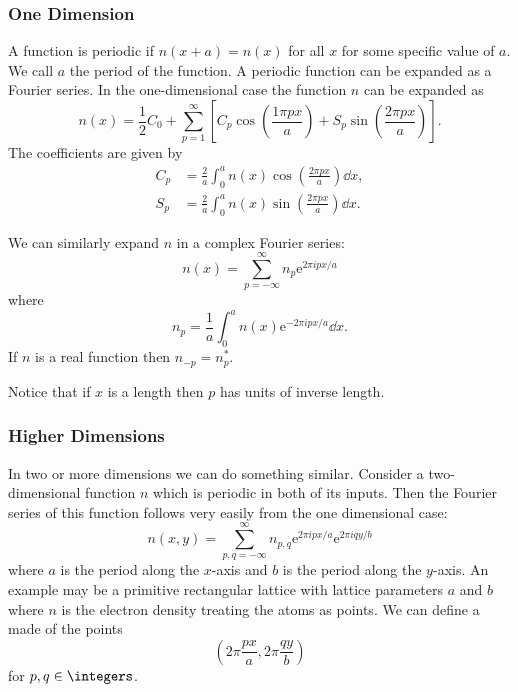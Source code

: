 \documentclass[fleqn]{NotesClass}
\newcommand*{\e}{\mathrm{e}}
\begin{document}
    \subsubsection{One Dimension}
    A function is periodic if \(n(x + a) = n(x)\) for all \(x\) for some specific value of \(a\).
    We call \(a\) the period of the function.
    A periodic function can be expanded as a Fourier series.
    In the one-dimensional case the function \(n\) can be expanded as
    \begin{equation}
        n(x) = \frac{1}{2} C_0 + \sum_{p=1}^{\infty} \left[ C_p \cos\left( \frac{1\pi p x}{a} \right) + S_p \sin \left( \frac{2\pi p x}{a} \right) \right].
    \end{equation}
    The coefficients are given by
    \begin{align}
        C_p &= \frac{2}{a} \int_0^a n(x) \cos\left( \frac{2\pi px}{a} \right) \dd{x},\\
        S_p &= \frac{2}{a} \int_0^a n(x) \sin\left( \frac{2\pi px}{a} \right) \dd{x}.
    \end{align}
    
    We can similarly expand \(n\) in a complex Fourier series:
    \begin{equation}
        n(x) = \sum_{p=-\infty}^{\infty} n_p \e^{2\pi i px/a}
    \end{equation}
    where
    \begin{equation}
        n_p = \frac{1}{a}\int_0^a n(x) \e^{-2\pi i px/a}\dd{x}.
    \end{equation}
    If \(n\) is a real function then \(n_{-p} = n_p^*\).
    
    Notice that if \(x\) is a length then \(p\) has units of inverse length.
    
    \subsubsection{Higher Dimensions}
    In two or more dimensions we can do something similar.
    Consider a two-dimensional function \(n\) which is periodic in both of its inputs.
    Then the Fourier series of this function follows very easily from the one dimensional case:
    \begin{equation}
        n(x, y) = \sum_{p, q = -\infty}^{\infty} n_{p,q}\e^{2\pi i px/a}\e^{2\pi i qy/b}
    \end{equation}
    where \(a\) is the period along the \(x\)-axis and \(b\) is the period along the \(y\)-axis.
    An example may be a primitive rectangular lattice with lattice parameters \(a\) and \(b\) where \(n\) is the electron density treating the atoms as points.
    We can define a  made of the points
    \begin{equation}
        (2\pi \frac{px}{a}, 2\pi\frac{qy}{b})
    \end{equation}
    for \(p, q \in \integers\).
    
\end{document}
